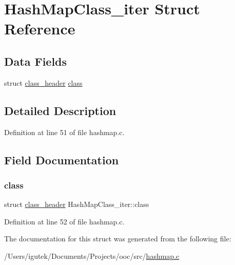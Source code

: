 \hypertarget{structHashMapClass__iter}{}\section{Hash\+Map\+Class\+\_\+iter Struct Reference}
\label{structHashMapClass__iter}
\subsection*{Data Fields}
\begin{DoxyCompactItemize}
\item 
struct \mbox{\hyperlink{structclass__header}{class\+\_\+header}} \mbox{\hyperlink{structHashMapClass__iter_a734f54017a71292a761cabc6fa8df712}{class}}
\end{DoxyCompactItemize}


\subsection{Detailed Description}


Definition at line 51 of file hashmap.\+c.



\subsection{Field Documentation}
\mbox{\label{structHashMapClass__iter_a734f54017a71292a761cabc6fa8df712}} 
\subsubsection{\texorpdfstring{class}{class}}
{\footnotesize\ttfamily struct \mbox{\hyperlink{structclass__header}{class\+\_\+header}} Hash\+Map\+Class\+\_\+iter\+::class}



Definition at line 52 of file hashmap.\+c.



The documentation for this struct was generated from the following file\+:\begin{DoxyCompactItemize}
\item 
/\+Users/igutek/\+Documents/\+Projects/ooc/src/\mbox{\hyperlink{hashmap_8c}{hashmap.\+c}}\end{DoxyCompactItemize}
